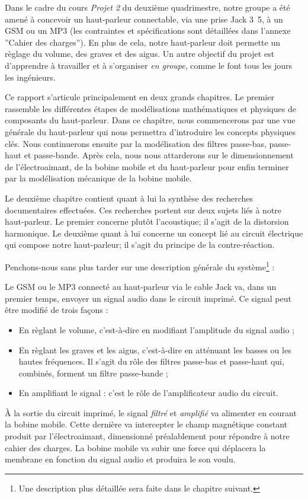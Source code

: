 

Dans le cadre du cours \textit{Projet 2} du deuxième quadrimestre, notre groupe a été amené à 
concevoir un haut-parleur connectable, via une prise Jack \unit{3.5}{\milli\meter}, à un 
GSM ou un MP3 (les contraintes et spécifications sont détaillées dans l'annexe ''Cahier des charges''). 
En plus de cela, notre haut-parleur doit permette un règlage du volume, des graves
et des aigus. Un autre objectif du projet est d'apprendre à travailler et à s'organiser \textit{en groupe}, 
comme le font tous les jours les ingénieurs.

Ce rapport s'articule principalement en deux grands chapitres. Le premier
rassemble les différentes étapes de modélisations mathématiques
et physiques de composants du haut-parleur. Dans ce chapitre, nous 
commencerons par une vue générale du haut-parleur qui nous
permettra d'introduire les concepts physiques clés. Nous continuerons
ensuite par la modélisation des filtres passe-bas, passe-haut et passe-bande.
Après cela, nous nous attarderons  sur le dimensionnement de l'électroaimant, de la bobine mobile et du haut-parleur pour enfin terminer par la modélisation mécanique de la bobine
mobile.

Le deuxième chapitre contient quant à lui la synthèse des recherches documentaires
effectuées. Ces recherches portent sur deux sujets liés à notre haut-parleur. Le premier
concerne plutôt l'acoustique; il s'agit de la 
distorsion harmonique. Le deuxième quant à lui concerne un concept lié au circuit électrique qui
compose notre haut-parleur; il s'agit du principe de la contre-réaction.

Penchons-nous sans plus tarder sur une description générale du système\footnote{Une
description plus détaillée sera faite dans le chapitre suivant.} :

Le GSM ou le MP3 connecté au haut-parleur via le cable Jack va, dans un premier temps, envoyer un signal audio dans le 
circuit imprimé. Ce signal peut être modifié de trois façons :

\begin{itemize}
	\item En règlant le volume, c'est-à-dire en modifiant l'amplitude du signal audio ;
	\item En règlant les graves et les aigus, c'est-à-dire en atténuant les basses ou les hautes
	fréquences. Il s'agit du rôle des filtres passe-bas et passe-haut qui, combinés, forment un filtre 
	passe-bande ;
 \item En amplifiant le signal : c'est le rôle de l'amplificateur audio du circuit.
\end{itemize}
 
À la sortie du circuit imprimé, le signal \textit{filtré} et \textit{amplifié} va alimenter en courant la bobine mobile.
Cette dernière va intercepter le champ magnétique constant produit par l'électroaimant, dimensionné préalablement
pour répondre à notre cahier des charges. La bobine mobile va subir une force qui déplacera la membrane en fonction
du signal audio et produira le son voulu.


